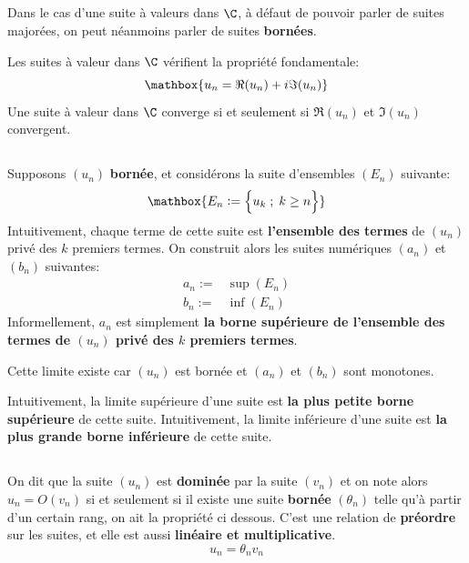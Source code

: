\subsection*{}
Dans le cas d'une suite à valeurs dans \(\C\), à défaut de pouvoir parler de suites majorées, on peut néanmoins parler de suites \textbf{bornées}.\<

Les suites à valeur dans \(\C\) vérifient la propriété fondamentale:
\[
    \mathbox{
        u_n = \Re(u_n) + i\Im(u_n)
    }
\]
Une suite à valeur dans \(\C\) converge si et seulement si \(\Re(u_n)\) et \(\Im(u_n)\) convergent.
\subsection*{}
Supposons \((u_n)\) \textbf{bornée}, et considérons la suite d'ensembles \((E_n)\) suivante:
\[
    \mathbox{
        E_n := \Bigl \{ u_k \; ; \; k \geq n \Bigl \}
    }
\]
Intuitivement, chaque terme de cette suite est \textbf{l'ensemble des termes} de \((u_n)\) privé des \(k\) premiers termes.\+
On construit alors les suites numériques \((a_n)\) et \((b_n)\) suivantes:
\begin{align*}
    a_n := &\sup(E_n) \\
    b_n := &\inf(E_n)
\end{align*}
Informellement, \(a_n\) est simplement \textbf{la borne supérieure de l'ensemble des termes de \((u_n)\) privé des \(k\) premiers termes}.\<

\<

Cette limite existe car \((u_n)\) est bornée et \((a_n)\) et \((b_n)\) sont monotones.\<

Intuitivement, la limite supérieure d'une suite est \textbf{la plus petite borne supérieure} de cette suite.\+
Intuitivement, la limite inférieure d'une suite est \textbf{la plus grande borne inférieure} de cette suite.

\subsection*{}

On dit que la suite \((u_n)\) est \textbf{dominée} par la suite \((v_n)\) et on note alors \(u_n = O(v_n)\) si et seulement si il existe une suite \textbf{bornée} \((\theta_n)\) telle qu'à partir d'un certain rang, on ait la propriété ci dessous.\+
C'est une relation de \textbf{préordre} sur les suites, et elle est aussi \textbf{linéaire et multiplicative}.
\[
    u_n = \theta_n v_n
\]


